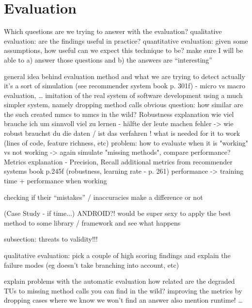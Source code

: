 \chapter{Evaluation}\label{ch:eval}
Which questions are we trying to answer with the evaluation?
    qualitative evaluation: are the findings useful in practice?
    quantitative evaluation: given some assumptions, how useful can we expect this technique to be?
    make sure I will be able to a) answer those questions and b) the answers are ``interesting''

general idea behind evaluation method and what we are trying to detect
actually it's a sort of simulation (see recommender system book p. 301f) - micro vs macro evaluation, \ldots
    imitation of the real system of software development
    using a much simpler system, namely dropping method calls
    obvious question: how similar are the such created mmcs to mmcs in the wild?
Robustness explanation
    wie viel brauche ich um sinnvoll viel zu lernen - hälfte der leute machen fehler -> wie robust brauchst du die daten / ist das verfahren !
    what is needed for it to work (lines of code, feature richness, etc) 
    problem: how to evaluate when it is "working" vs not working -> again simulate "missing methods", compare performance?
Metrics explanation - Precision, Recall
    additional metrics from recommender systems book p.245f (robustness, learning rate - p. 261)
    performance -> training time + performance when working


checking if their ``mistakes'' / inaccuracies make a difference or not

(Case Study - if time...)
    ANDROID?!
    would be super sexy to apply the best method to some library / framework and see what happens

subsection: threats to validity!!!

qualitative evaluation:
    pick a couple of high scoring findings and explain the failure modes (eg doesn't take branching into account, etc)

explain problems with the automatic evaluation
    how related are the degraded TUs to missing method calls you can find in the wild?
    improving the metrics by dropping cases where we know we won't find an answer
    also mention runtime!
    \ldots
